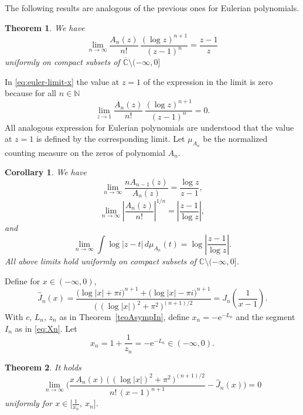 \documentclass[11pt]{article}
\newtheorem{theo}{Theorem}
\newtheorem{cor}{Corollary}
\newcommand{\N}{\mathbb{N}}
\newcommand{\C}{\mathbb{C}}
\newcommand{\e}{\mathrm{e}}
\begin{document}
The following results are analogous of the previous ones  for Eulerian polynomials.
\begin{theo} We have
\begin{equation}\label{eq:euler-limit-x} 
\lim_{n\to\infty}\frac{A_n(z)}{n!}\,\frac{(\log z)^{n+1}}{(z-1)^n}=\frac{z-1}{z}
\end{equation}
uniformly on compact subsets of $\overline{\C}\setminus(-\infty,0]$
\end{theo}

In \eqref{eq:euler-limit-x} the value at $z=1$ of the expression in the limit is zero because for all $n\in\N$
\[
\lim_{z\to 1}\frac{A_n(z)}{n!}\,\frac{(\log z)^{n+1}}{(z-1)^n}=0.
\]
All analogous expression for Eulerian polynomials are understood that the value at $z=1$ is defined by the corresponding limit. Let $\mu_{A_n}$ be the normalized counting measure on the zeros of polynomial $A_n$.

\begin{cor} \label{LimCocRaizEulerian} We have
\[
\lim_{n\to\infty}\frac{nA_{n-1}(z)}{A_n(z)}=\frac{\log z}{z-1},
\]
\[
\lim_{n\to\infty}\left|\frac{A_n(z)}{n!}\right|^{1/n}=\left|\frac{z-1}{\log z}\right|,
\]
and 
\[
\lim_{n\to\infty}\int\log|z-t|\, d\mu_{A_n}(t)=\log \left|\frac{z-1}{\log z}\right|.
\]
All above limits  hold uniformly on compact subsets of $\C\setminus (-\infty,0]$.
\end{cor}

Define for $x\in(-\infty,0)$,
\begin{equation}\label{eq:JnEuler}
 \widehat{J}_n(x)=\frac{\big(\log|x|+\pi i\big)^{n+1}+\big(\log|x|-\pi i\big)^{n+1}}{\big(\,(\log|x|)^2+\pi^2\,\big)^{(n+1)/2}}=J_n\!\left(\frac{1}{x-1}\right).
\end{equation}
With $c,\,L_n,\,z_n$ as in Theorem~\ref{teoAsympIn}, define $x_n=-\e^{-L_n}$ and the segment $I_n$ as in \eqref{eq:Xn}. Let
\begin{equation}\label{eq:Xn}
x_n = 1+\frac{1}{z_n} = -\mathrm{e}^{-L_n}\in(-\infty,0).
\end{equation}

\begin{theo}\label{thm:euler}
It holds
\begin{equation}\label{eq:euler-limit}
\lim_{n\to\infty}\Bigg(\frac{x\,A_n(x)\,\big(\,(\log|x|)^2+\pi^2\,\big)^{(n+1)/2}}{n!\,(x-1)^{n+1}}-
 \widehat{J}_n(x)\Bigg)=0
\end{equation}
uniformly for $x\in \Big[\frac1{x_n},\ x_n \Big]$.
\end{theo}
\end{document}
